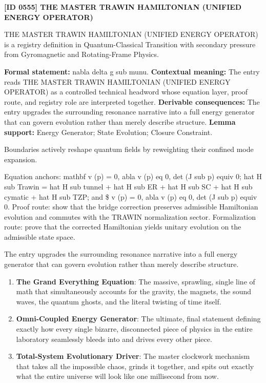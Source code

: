 \clearpage
\noindent\textbf{[ID 0555] THE MASTER TRAWIN HAMILTONIAN (UNIFIED ENERGY OPERATOR)}\par
\vspace{0.35em}
\begingroup\small
{}
THE MASTER TRAWIN HAMILTONIAN (UNIFIED ENERGY OPERATOR) is a registry definition in Quantum-Classical Transition with secondary pressure from Gyromagnetic and Rotating-Frame Physics.

\begingroup\footnotesize\setlength{\emergencystretch}{3em}\sloppy
\textbf{Formal statement:} nabla delta g sub munu. \textbf{Contextual meaning:} The entry reads THE MASTER TRAWIN HAMILTONIAN (UNIFIED ENERGY OPERATOR) as a controlled technical headword whose equation layer, proof route, and registry role are interpreted together. \textbf{Derivable consequences:} The entry upgrades the surrounding resonance narrative into a full energy generator that can govern evolution rather than merely describe structure. \textbf{Lemma support:} Energy Generator; State Evolution; Closure Constraint.\par
\endgroup

Boundaries actively reshape quantum fields by reweighting their confined mode expansion.

Equation anchors: mathbf v (p) = 0, abla v (p) eq 0, det (J sub p) equiv 0; hat H sub Trawin = hat H sub tunnel + hat H sub ER + hat H sub SC + hat H sub cymatic + hat H sub TZP; and \$ v (p) = 0, abla v (p) eq 0, det (J sub p) equiv 0. Proof route: show that the bridge correction preserves admissible Hamiltonian evolution and commutes with the TRAWIN normalization sector. Formalization route: prove that the corrected Hamiltonian yields unitary evolution on the admissible state space.

The entry upgrades the surrounding resonance narrative into a full energy generator that can govern evolution rather than merely describe structure.
\endgroup

\begin{enumerate}[leftmargin=1.6em,itemsep=6pt,topsep=4pt]
\item \textbf{The Grand Everything Equation}: The massive, sprawling, single line of math that simultaneously accounts for the gravity, the magnets, the sound waves, the quantum ghosts, and the literal twisting of time itself.
\item \textbf{Omni-Coupled Energy Generator}: The ultimate, final statement defining exactly how every single bizarre, disconnected piece of physics in the entire laboratory seamlessly bleeds into and drives every other piece.
\item \textbf{Total-System Evolutionary Driver}: The master clockwork mechanism that takes all the impossible chaos, grinds it together, and spits out exactly what the entire universe will look like one millisecond from now.
\end{enumerate}

